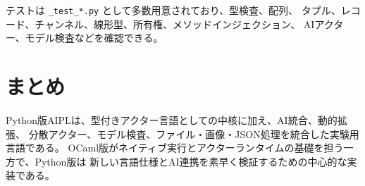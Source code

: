 \documentclass[11pt,a4paper,uplatex,dvipdfmx]{jsarticle}
\begin{document}
テストは \texttt{\_test\_*.py} として多数用意されており、型検査、配列、
タプル、レコード、チャンネル、線形型、所有権、メソッドインジェクション、
AIアクター、モデル検査などを確認できる。

\section{まとめ}

Python版AIPLは、型付きアクター言語としての中核に加え、AI統合、動的拡張、
分散アクター、モデル検査、ファイル・画像・JSON処理を統合した実験用言語である。
OCaml版がネイティブ実行とアクターランタイムの基礎を担う一方で、Python版は
新しい言語仕様とAI連携を素早く検証するための中心的な実装である。
\end{document}
